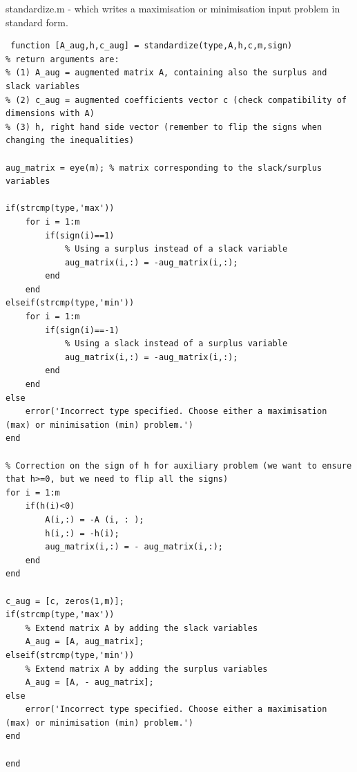 \documentclass[unicode,11pt,a4paper,oneside,numbers=endperiod,openany]{scrartcl}
\begin{document}
standardize.m - which writes a maximisation or minimisation input problem in standard form.
\begin{lstlisting}
 function [A_aug,h,c_aug] = standardize(type,A,h,c,m,sign)
% return arguments are:
% (1) A_aug = augmented matrix A, containing also the surplus and slack variables
% (2) c_aug = augmented coefficients vector c (check compatibility of dimensions with A)
% (3) h, right hand side vector (remember to flip the signs when changing the inequalities)

aug_matrix = eye(m); % matrix corresponding to the slack/surplus variables

if(strcmp(type,'max'))
    for i = 1:m
        if(sign(i)==1)
            % Using a surplus instead of a slack variable
            aug_matrix(i,:) = -aug_matrix(i,:);
        end
    end
elseif(strcmp(type,'min'))
    for i = 1:m
        if(sign(i)==-1)
            % Using a slack instead of a surplus variable
            aug_matrix(i,:) = -aug_matrix(i,:);
        end
    end
else
    error('Incorrect type specified. Choose either a maximisation (max) or minimisation (min) problem.')
end

% Correction on the sign of h for auxiliary problem (we want to ensure that h>=0, but we need to flip all the signs)
for i = 1:m
    if(h(i)<0)
        A(i,:) = -A (i, : );
        h(i,:) = -h(i);
        aug_matrix(i,:) = - aug_matrix(i,:);
    end
end

c_aug = [c, zeros(1,m)];
if(strcmp(type,'max'))
    % Extend matrix A by adding the slack variables
    A_aug = [A, aug_matrix];
elseif(strcmp(type,'min'))
	% Extend matrix A by adding the surplus variables
    A_aug = [A, - aug_matrix];
else
    error('Incorrect type specified. Choose either a maximisation (max) or minimisation (min) problem.')
end

end
\end{lstlisting}
\end{document}
